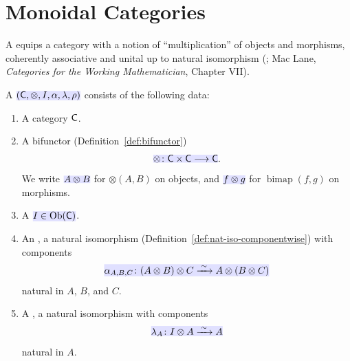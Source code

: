 \documentclass[../preamble]{subfiles}
\begin{document}
\section{Monoidal Categories}
\label{sec:monoidal-category}

A  equips a category with a notion of ``multiplication''
of objects and morphisms,
coherently associative and unital up to natural isomorphism
(;
Mac Lane, \emph{Categories for the Working Mathematician}, Chapter VII).

\begin{definition}
  \label{def:monoidal-category}
  A 
  $\newmath{(\Category{C}, \otimes, I, \alpha, \lambda, \rho)}$
  consists of the following data:
  \begin{enumerate}
    \item A category $\mathsf{C}$.

    \item A  bifunctor
      (Definition~\ref{def:bifunctor})
      \begin{equation}
        \label{eq:tensor-product}
        \newmath{\otimes \colon \Category{C} \times \Category{C} \lto \Category{C}}.
      \end{equation}
      We write $\newmath{A \otimes B}$ for $\otimes(A, B)$
      on objects,
      and $\newmath{f \otimes g}$ for $\operatorname{bimap}(f, g)$
      on morphisms.

    \item A 
      $\newmath{I \in \Ob(\Category{C})}$.

    \item An ,
      a natural isomorphism
      (Definition~\ref{def:nat-iso-componentwise})
      with components
      \begin{equation}
        \label{eq:associator}
        \newmath{\alpha_{A,B,C}
          \colon (A \otimes B) \otimes C
          \xrightarrow{\;\sim\;} A \otimes (B \otimes C)}
      \end{equation}
      natural in $A$, $B$, and $C$.

    \item A ,
      a natural isomorphism with components
      \begin{equation}
        \label{eq:left-unitor}
        \newmath{\lambda_A \colon I \otimes A \xrightarrow{\;\sim\;} A}
      \end{equation}
      natural in $A$.


\end{enumerate}
\end{definition}
\end{document}
